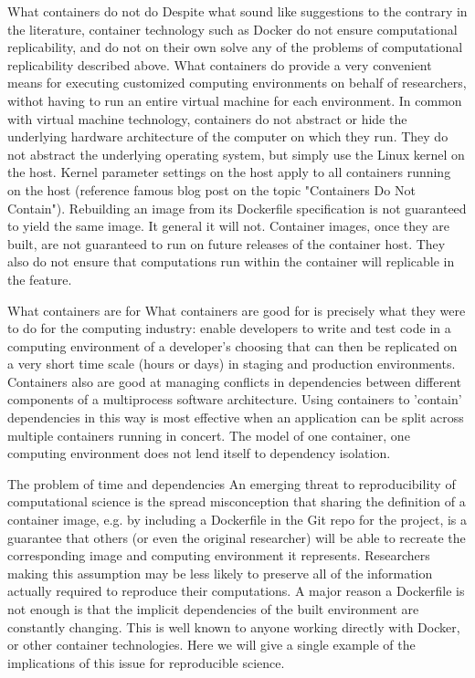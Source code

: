 			What containers do not do
				Despite what sound like suggestions to the contrary in the literature, container technology such as Docker do not ensure computational replicability,
					and do not on their own solve any of the problems of computational replicability described above.
				What containers do provide a very convenient means for executing customized computing environments on behalf of researchers, withot having to run
					an entire virtual machine for each environment.
				In common with virtual machine technology, containers do not abstract or hide the underlying hardware architecture of the computer on which they run.
				They do not abstract the underlying operating system, but simply use the Linux kernel on the host.  Kernel parameter settings on the host apply to 
					all containers running on the host (reference famous blog post on the topic "Containers Do Not Contain").
				Rebuilding an image from its Dockerfile specification is not guaranteed to yield the same image.  It general it will not.
				Container images, once they are built, are not guaranteed to run on future releases of the container host.
				They also do not ensure that computations run within the container will replicable in the feature.
	
			What containers are for
				What containers are good for is precisely what they were to do for the computing industry:  enable developers to write and test code in a
					computing environment of a developer's choosing that can then be replicated on a very short time scale (hours or days) in staging 
					and production environments.
				Containers also are good at managing conflicts in dependencies between different components of a multiprocess software architecture.
				Using containers to 'contain' dependencies in this way is most effective when an application can be split across multiple containers running in concert. 
				The model of one container, one computing environment does not lend itself to dependency isolation. 
	
			The problem of time and dependencies
				An emerging threat to reproducibility of computational science is the spread misconception that sharing the definition of a container image, 
					e.g. by including a Dockerfile in the Git repo for the project, is a guarantee that others (or even the original researcher) will be able to 
					recreate the corresponding image and computing environment it represents.
				Researchers making this assumption may be less likely to preserve all of the information actually required to reproduce their computations.
				A major reason a Dockerfile is not enough is that the implicit dependencies of the built environment are constantly changing.
				This is well known to anyone working directly with Docker, or other container technologies.
				Here we will give a single example of the implications of this issue for reproducible science.
	

